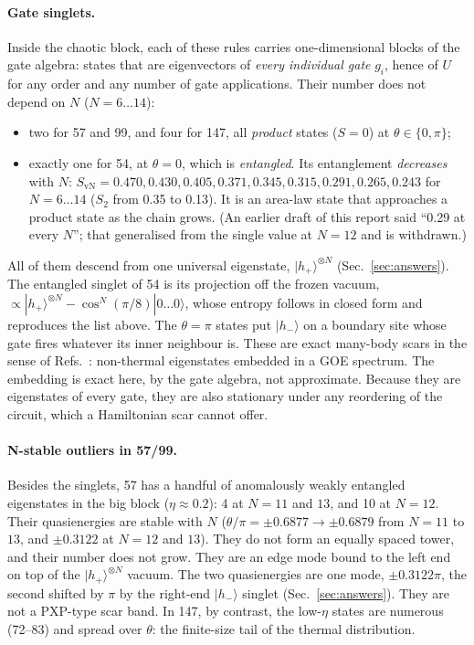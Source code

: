 \paragraph{Gate singlets.} Inside the chaotic block, each of these rules carries one-dimensional blocks of the gate
algebra: states that are eigenvectors of \emph{every individual gate} $g_i$, hence of $U$ for any order and any number of
gate applications. Their number does not depend on $N$ ($N=6\ldots14$):
\begin{itemize}
\item two for 57 and 99, and four for 147, all \emph{product} states ($S=0$) at $\theta\in\{0,\pi\}$;
\item exactly one for 54, at $\theta=0$, which is \emph{entangled}. Its entanglement \emph{decreases} with $N$:
  $S_\mathrm{vN}=0.470, 0.430, 0.405, 0.371, 0.345, 0.315, 0.291, 0.265, 0.243$ for $N=6\ldots14$ ($S_2$ from 0.35 to
  0.13). It is an area-law state that approaches a product state as the chain grows. (An earlier draft of this report said
  ``0.29 at every $N$''; that generalised from the single value at $N=12$ and is withdrawn.)
\end{itemize}
All of them descend from one universal eigenstate, $|h_+\rangle^{\otimes N}$ (Sec.~\ref{sec:answers}). The entangled
singlet of 54 is its projection off the frozen vacuum, $\propto|h_+\rangle^{\otimes N}-\cos^N(\pi/8)|0\ldots0\rangle$,
whose entropy follows in closed form and reproduces the list above. The $\theta=\pi$ states put $|h_-\rangle$ on a
boundary site whose gate fires whatever its inner neighbour is. These are exact many-body scars in the sense of
Refs.~\cite{shiraishi2017,moudgalya2022review}: non-thermal eigenstates embedded in a GOE spectrum. The embedding is exact here, by the gate algebra, not approximate. Because they are
eigenstates of every gate, they are also stationary under any reordering of the circuit, which a Hamiltonian scar cannot
offer.

\paragraph{N-stable outliers in 57/99.} Besides the singlets, 57 has a handful of anomalously weakly entangled eigenstates
in the big block ($\eta\approx0.2$): 4 at $N=11$ and $13$, and 10 at $N=12$. Their quasienergies are stable with $N$
($\theta/\pi=\pm0.6877\to\pm0.6879$ from $N=11$ to $13$, and $\pm0.3122$ at $N=12$ and $13$). They do not form an equally
spaced tower, and their number does not grow. They are an edge mode bound to the left end on top of the $|h_+\rangle^{\otimes N}$ vacuum. The two
quasienergies are one mode, $\pm0.3122\pi$, the second shifted by $\pi$ by the right-end $|h_-\rangle$ singlet
(Sec.~\ref{sec:answers}). They are not a PXP-type scar band. In 147, by contrast, the low-$\eta$ states are numerous (72--83) and spread
over $\theta$: the finite-size tail of the thermal distribution.

